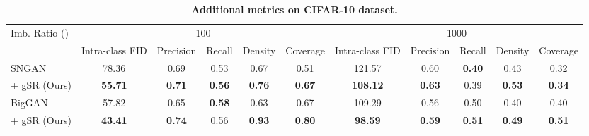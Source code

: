 \documentclass[runningheads,table]{llncs}
\begin{document}
\begin{table}[!b]{

\vspace{-0.4cm}
\caption{\textbf{Additional metrics on CIFAR-10 dataset.}}
\label{tab:supp:intra-fid}}
\resizebox{\linewidth}{!}
{ 
\begin{tabular}{lccccc|ccccc}
\toprule
Imb. Ratio ()                & \multicolumn{5}{c|}{100}                                                                          & \multicolumn{5}{c}{1000}                                                                          \\
                                  & \multicolumn{1}{l}{Intra-class FID} & Precision & Recall & \multicolumn{1}{l}{Density} & Coverage & \multicolumn{1}{l}{Intra-class FID} & Precision & Recall & Density & \multicolumn{1}{l}{Coverage} \\ \cmidrule(l){2-11} 
SNGAN   & 78.36                               & 0.69      & 0.53   & 0.67                        & 0.51     & {121.57}          & 0.60      & \textbf{0.40}    & 0.43    & 0.32                         \\
 \; + gSR (Ours) & \textbf{55.71}                               & \textbf{0.71}      & \textbf{0.56}   & \textbf{0.76}                        & \textbf{0.67}     & \textbf{108.12}                              & \textbf{0.63}      & 0.39   & \textbf{0.53}    & \textbf{0.34}                         \\ \midrule
BigGAN       & 57.82                               & 0.65      & \textbf{0.58}   & 0.63                        & 0.67     & 109.29                              & 0.56     & 0.50   & 0.40    & 0.40                          \\
 \; + gSR (Ours) & \textbf{43.41}                               & \textbf{0.74}      & 0.56   & \textbf{0.93}                        & \textbf{0.80}      & \textbf{98.59}                               & \textbf{0.59}      & \textbf{0.51}   & \textbf{0.49}    & \textbf{0.51}                         \\ \bottomrule
\end{tabular}
}

\vspace{-0.5cm}
\end{table}
\end{document}
